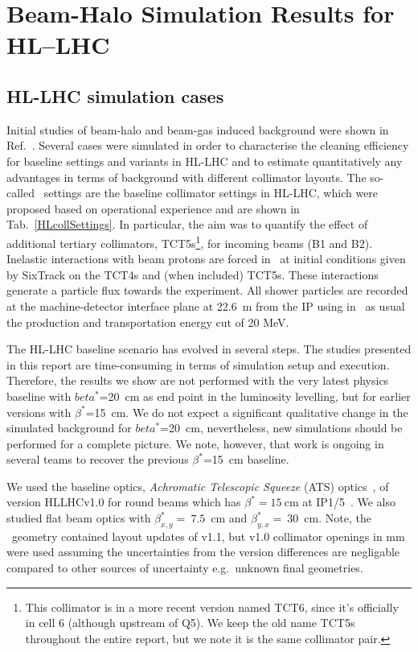 \section{Beam-Halo Simulation Results for HL--LHC\label{hllhcResults}}

\subsection{HL-LHC simulation cases}

Initial studies of beam-halo and beam-gas induced background were shown in Ref.~\cite{kweeIpac14,ipac2015_rkh}. Several cases were simulated in order to characterise the cleaning efficiency for baseline settings and variants in HL-LHC and to estimate quantitatively any advantages in terms of background with different collimator layouts. The so-called \twosigmaret~settings are the baseline collimator settings in HL-LHC, which were proposed based on operational experience \cite{collSettRef} and are shown in Tab.~\ref{HLcollSettings}. In particular, the aim was to quantify the effect of additional tertiary collimators, TCT5s\footnote{This collimator is in a more recent version named TCT6, since it's officially in cell 6 (although upstream of Q5). We keep the old name TCT5s throughout the entire report, but we note it is the same collimator pair.}, for incoming beams (B1 and B2). Inelastic interactions with beam protons are forced in \fluka~at initial conditions given by SixTrack on the TCT4s and (when included) TCT5s. These interactions generate a particle flux towards the experiment. All shower particles are recorded at the machine-detector interface plane at 22.6~m from the IP using in \fluka~as usual the production and transportation energy cut of 20 MeV.

The HL-LHC baseline scenario has evolved in several steps. The studies presented in this report are time-consuming in terms of simulation setup and execution. Therefore, the results we show are not performed with the very latest physics baseline with $beta^*$=20~cm as end point in the luminosity levelling, but for earlier versions with $\beta^*$=15~cm. We do not expect a significant qualitative change in the simulated background for $beta^*$=20~cm, nevertheless, new simulations should be performed for a complete picture. We note, however, that work is ongoing in several teams to recover the previous $\beta^*$=15~cm baseline.

We used the baseline optics, \textit{Achromatic Telescopic Squeeze} (ATS) optics~\cite{ATSref}, of version HLLHCv1.0 for round beams which has $\beta^* = 15~$cm at IP1/5~\cite{opticsWebRef}. We also studied flat beam optics with $\beta^*_{x,y} =~7.5$~cm and $\beta^*_{y,x} =~30$~cm. Note, the \fluka~geometry contained layout updates of v1.1, but v1.0 collimator openings in mm were used assuming the uncertainties from the version differences are negligable compared to other sources of uncertainty e.g.~unknown final geometries. 

